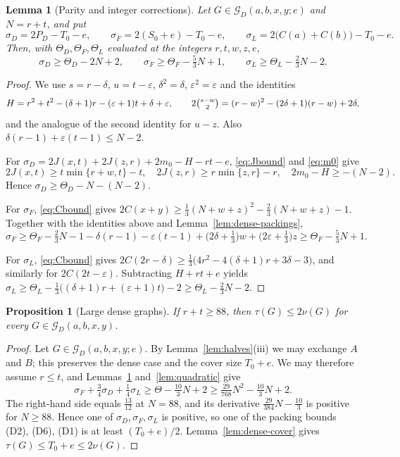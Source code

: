 \documentclass{amsart}
\newtheorem{lemma}[theorem]{Lemma}
\newtheorem{proposition}[theorem]{Proposition}
\theoremstyle{definition}
\numberwithin{equation}{section}
\numberwithin{table}{section}
\begin{document}
\begin{lemma}[Parity and integer corrections]\label{lem:errors}
Let $G\in\mathcal G_D(a,b,x,y;e)$ and $N=r+t$, and put
\[
\sigma_D=2P_D-T_0-e,\qquad \sigma_F=2(S_0+e)-T_0-e,\qquad \sigma_L=2\bigl(C(a)+C(b)\bigr)-T_0-e.
\]
Then, with $\Theta_D,\Theta_F,\Theta_L$ evaluated at the integers $r,t,w,z,e$,
\[
\sigma_D\ge\Theta_D-2N+2,\qquad \sigma_F\ge\Theta_F-\tfrac53N+1,\qquad \sigma_L\ge\Theta_L-\tfrac23N-2.
\]
\end{lemma}

\begin{proof}
We use $s=r-\delta$, $u=t-\varepsilon$, $\delta^2=\delta$, $\varepsilon^2=\varepsilon$ and the identities
\[
H=r^2+t^2-(\delta+1)r-(\varepsilon+1)t+\delta+\varepsilon,\qquad 2\tbinom{s-w}{2}=(r-w)^2-(2\delta+1)(r-w)+2\delta,
\]
and the analogue of the second identity for $u-z$. Also $\delta(r-1)+\varepsilon(t-1)\le N-2$.

For $\sigma_D=2J(x,t)+2J(z,r)+2m_0-H-rt-e$, \eqref{eq:Jbound} and \eqref{eq:m0} give
\[
2J(x,t)\ge t\min\{r+w,t\}-t,\quad 2J(z,r)\ge r\min\{z,r\}-r,\quad 2m_0-H\ge-(N-2).
\]
Hence $\sigma_D\ge\Theta_D-N-(N-2)$.

For $\sigma_F$, \eqref{eq:Cbound} gives $2C(x+y)\ge\frac13(N+w+z)^2-\frac23(N+w+z)-1$. Together with the identities above and Lemma~\ref{lem:dense-packings},
\[
\sigma_F\ge\Theta_F-\tfrac23N-1-\delta(r-1)-\varepsilon(t-1)+\bigl(2\delta+\tfrac13\bigr)w+\bigl(2\varepsilon+\tfrac13\bigr)z\ge\Theta_F-\tfrac53N+1.
\]

For $\sigma_L$, \eqref{eq:Cbound} gives $2C(2r-\delta)\ge\frac13\bigl(4r^2-4(\delta+1)r+3\delta-3\bigr)$, and similarly for $2C(2t-\varepsilon)$. Subtracting $H+rt+e$ yields $\sigma_L\ge\Theta_L-\frac13\bigl((\delta+1)r+(\varepsilon+1)t\bigr)-2\ge\Theta_L-\frac23N-2$.
\end{proof}

\begin{proposition}[Large dense graphs]\label{prop:dense-large}
If $r+t\ge 88$, then $\tau(G)\le 2\nu(G)$ for every $G\in\mathcal G_D(a,b,x,y)$.
\end{proposition}

\begin{proof}
Let $G\in\mathcal G_D(a,b,x,y;e)$. By Lemma~\ref{lem:halves}(iii) we may exchange $A$ and $B$; this preserves the dense case and the cover size $T_0+e$. We may therefore assume $r\le t$, and Lemmas~\ref{lem:errors} and~\ref{lem:quadratic} give
\[
\sigma_F+\tfrac34\sigma_D+\tfrac14\sigma_L\ge\Theta-\tfrac{10}{3}N+2\ge\tfrac{29}{768}N^2-\tfrac{10}{3}N+2 .
\]
The right-hand side equals $\frac{13}{12}$ at $N=88$, and its derivative $\frac{29}{384}N-\frac{10}3$ is positive for $N\ge 88$. Hence one of $\sigma_D,\sigma_F,\sigma_L$ is positive, so one of the packing bounds (D2), (D6), (D1) is at least $(T_0+e)/2$. Lemma~\ref{lem:dense-cover} gives $\tau(G)\le T_0+e\le 2\nu(G)$.
\end{proof}
\end{document}
